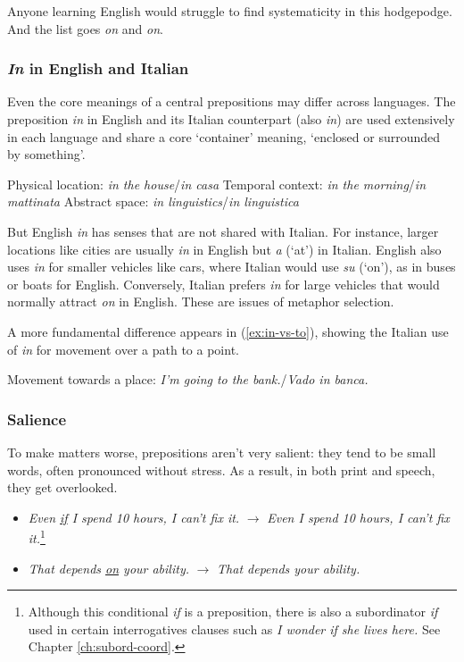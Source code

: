Anyone learning English would struggle to find systematicity in this hodgepodge. And the list goes \emph{on} and \emph{on}.

\subsubsection*{\textit{In} in English and Italian}

Even the core meanings of a central prepositions may differ across languages.
The preposition \textit{in} in English and its Italian counterpart (also \textit{in}) are used extensively in each language and share a core `container' meaning, `enclosed or
surrounded by something'.

\ea \label{ex:in-containment}
    \ea Physical location: \textit{in the house}/\textit{in casa}
    \ex Temporal context: \textit{in the morning}/\textit{in mattinata}
    \ex Abstract space: \textit{in linguistics}/\textit{in linguistica}
    \z
\z

But English \textit{in} has senses that are not shared with Italian. For instance, larger locations like cities are usually \textit{in} in English but \textit{a} (`at') in Italian. English also uses \textit{in} for smaller vehicles like cars, where Italian would use \textit{su} (`on'), as in buses or boats for English. Conversely, Italian prefers \textit{in} for large vehicles that would normally attract \textit{on} in English. These are issues of metaphor selection.

A more fundamental difference appears in (\ref{ex:in-vs-to}), showing the Italian use of \textit{in}
for movement over a path to a point.

\ea Movement towards a place: \textit{I'm going to the bank.}/\textit{Vado in banca.}\label{ex:in-vs-to}
\z
{}

\subsubsection*{Salience}
To make matters worse, prepositions aren't very salient: they tend to be small words, often pronounced without stress. As a result, in both print and speech, they get overlooked.

\begin{itemize}
    \item   \textit{Even \uline{if} I spend 10 hours, I can't fix it.} $\rightarrow$ \textit{Even I spend 10 hours, I can't fix it.}\footnote{Although this conditional  \textit{if} is a preposition, there is also a subordinator \textit{if} used in certain interrogatives clauses such as \textit{I wonder if she lives here.} See Chapter \ref{ch:subord-coord}.}
    \item \textit{That depends \uline{on} your ability.} $\rightarrow$ \textit{That depends your ability.}
\end{itemize}

